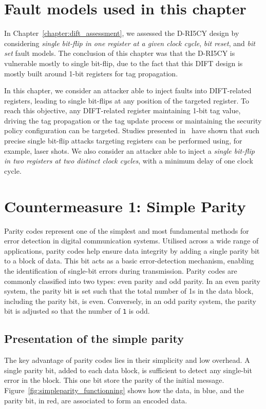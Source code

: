 \section{Fault models used in this chapter}
In Chapter~\ref{chapter:dift_assessment}, we assessed the D-RI5CY design by considering \textit{single bit-flip in one register at a given clock cycle}, \textit{bit reset}, and \textit{bit set} fault models. The conclusion of this chapter was that the D-RI5CY is vulnerable mostly to single bit-flip, due to the fact that this DIFT design is mostly built around 1-bit registers for tag propagation.

In this chapter, we consider an attacker able to inject faults into DIFT-related registers, leading to single bit-flips at any position of the targeted register. To reach this objective, any DIFT-related register maintaining 1-bit tag value, driving the tag propagation or the tag update process or maintaining the security policy configuration can be targeted. Studies presented in~\cite{ZDCRT-12-dcis,CLFT-14-cosade} have shown that such precise single bit-flip attacks targeting registers can be performed using, for example, laser shots. We also consider an attacker able to inject a \textit{single bit-flip in two registers at two distinct clock cycles}, with a minimum delay of one clock cycle.

\section{Countermeasure 1: Simple Parity}
\label{chapter:simpleparity}

Parity codes represent one of the simplest and most fundamental methods for error detection in digital communication systems. Utilised across a wide range of applications, parity codes help ensure data integrity by adding a single parity bit to a block of data. This bit acts as a basic error-detection mechanism, enabling the identification of single-bit errors during transmission. Parity codes are commonly classified into two types: even parity and odd parity. In an even parity system, the parity bit is set such that the total number of 1s in the data block, including the parity bit, is even. Conversely, in an odd parity system, the parity bit is adjusted so that the number of \texttt{1} is odd.

\subsection{Presentation of the simple parity}
The key advantage of parity codes lies in their simplicity and low overhead. A single parity bit, added to each data block, is sufficient to detect any single-bit error in the block. This one bit store the parity of the initial message. Figure~\ref{fig:simpleparity_functionning} shows how the data, in blue, and the parity bit, in red, are associated to form an encoded data.

